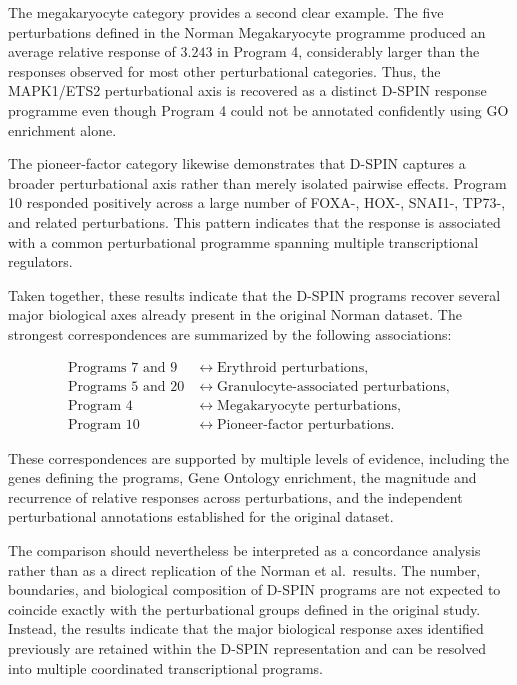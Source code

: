\documentclass[11pt,a4paper]{article}
\begin{document}
The megakaryocyte category provides a second clear example. The five perturbations defined in the Norman Megakaryocyte programme produced an average relative response of $3.243$ in Program 4, considerably larger than the responses observed for most other perturbational categories. Thus, the MAPK1/ETS2 perturbational axis is recovered as a distinct D-SPIN response programme even though Program 4 could not be annotated confidently using GO enrichment alone.

The pioneer-factor category likewise demonstrates that D-SPIN captures a broader perturbational axis rather than merely isolated pairwise effects. Program 10 responded positively across a large number of FOXA-, HOX-, SNAI1-, TP73-, and related perturbations. This pattern indicates that the response is associated with a common perturbational programme spanning multiple transcriptional regulators.

Taken together, these results indicate that the D-SPIN programs recover several major biological axes already present in the original Norman dataset. The strongest correspondences are summarized by the following associations:

$$
\begin{aligned}
\text{Programs 7 and 9}
&\longleftrightarrow
\text{Erythroid perturbations},\\
\text{Programs 5 and 20}
&\longleftrightarrow
\text{Granulocyte-associated perturbations},\\
\text{Program 4}
&\longleftrightarrow
\text{Megakaryocyte perturbations},\\
\text{Program 10}
&\longleftrightarrow
\text{Pioneer-factor perturbations}.
\end{aligned}
$$

These correspondences are supported by multiple levels of evidence, including the genes defining the programs, Gene Ontology enrichment, the magnitude and recurrence of relative responses across perturbations, and the independent perturbational annotations established for the original dataset.

The comparison should nevertheless be interpreted as a concordance analysis rather than as a direct replication of the Norman et al.~results. The number, boundaries, and biological composition of D-SPIN programs are not expected to coincide exactly with the perturbational groups defined in the original study. Instead, the results indicate that the major biological response axes identified previously are retained within the D-SPIN representation and can be resolved into multiple coordinated transcriptional programs.
\end{document}
